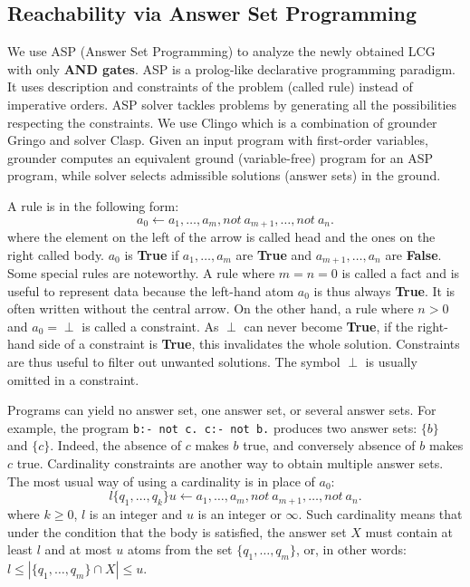 \subsection{Reachability via Answer Set Programming}
We use ASP  (Answer Set Programming) \cite{baral2003knowledge} to analyze the newly obtained LCG with only \textbf{AND gates}.
ASP is a prolog-like declarative programming paradigm.
It uses description and constraints of the problem (called rule) instead of imperative orders.
ASP solver tackles problems by generating all the possibilities respecting the constraints. 
We use Clingo \cite{gebser2016theory} which is a combination of grounder Gringo and solver Clasp. 
Given an input program with first-order variables, grounder computes an equivalent ground (variable-free) program for an ASP program, while solver selects admissible solutions (answer sets) in the ground.

A rule is in the following form:
$$a_0 \gets a_1 , \ldots , a_m, not\ a_{m+1}, \ldots , not\ a_n.$$
where the element on the left of the arrow is called head and the ones on the right called body.
$a_0$ is \textbf{True} if $a_1 , \ldots , a_m$ are \textbf{True} and $a_{m+1}, \ldots , a_n$ are \textbf{False}.
Some special rules are noteworthy. 
A rule where $m = n = 0$ is called a fact and is useful to represent data because the left-hand atom $a_0$ is thus always \textbf{True}.
It is often written without the central arrow.
On the other hand, a rule where $n > 0$ and $a_0 = \perp$ is called a constraint.
As $\perp$ can never become \textbf{True}, if the right-hand side of a constraint is \textbf{True}, this invalidates the whole solution.
Constraints are thus useful to filter out unwanted solutions.
The symbol $\perp$ is usually omitted in a constraint.

Programs can yield no answer set, one answer set, or several answer sets. 
For example, the program \texttt{b:- not c. c:- not b.}  produces two answer sets: $\{b\}$ and $\{c\}$.
Indeed, the absence of $c$ makes $b$ true, and conversely absence of $b$ makes $c$ true. 
Cardinality constraints are another way to obtain multiple answer sets. 
The most usual way of using a cardinality is in place of $a_0$:
$$l \{q_1, \ldots , q_k \} u \gets a_1, \ldots , a_m, not\ a_{m+1}, \ldots , not\ a_n.$$
where $k \geq 0$, $l$ is an integer and $u$ is an integer or $\infty$. 
Such cardinality means that under the condition that the body is satisfied, the answer set $X$ must contain at least $l$ and at most $u$ atoms from the set $\{q_1, \ldots  , q_m\}$, or, in other words: $l \leq |\{q_1, \ldots  , q_m\} \cap X| \leq u$. %

